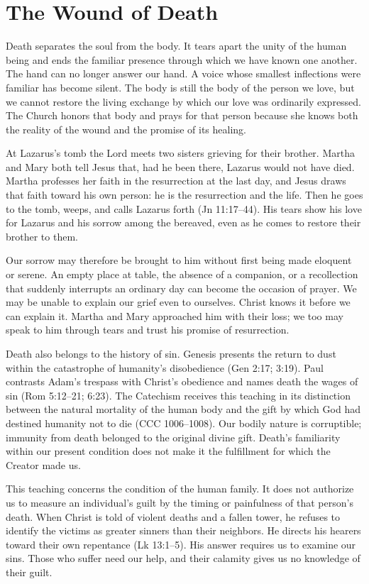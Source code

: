 \section{The Wound of Death}

Death separates the soul from the body. It tears apart the unity of the human being and ends the familiar presence through which we have known one another. The hand can no longer answer our hand. A voice whose smallest inflections were familiar has become silent. The body is still the body of the person we love, but we cannot restore the living exchange by which our love was ordinarily expressed. The Church honors that body and prays for that person because she knows both the reality of the wound and the promise of its healing.

At Lazarus's tomb the Lord meets two sisters grieving for their brother. Martha and Mary both tell Jesus that, had he been there, Lazarus would not have died. Martha professes her faith in the resurrection at the last day, and Jesus draws that faith toward his own person: he is the resurrection and the life. Then he goes to the tomb, weeps, and calls Lazarus forth (Jn 11:17--44). His tears show his love for Lazarus and his sorrow among the bereaved, even as he comes to restore their brother to them.

Our sorrow may therefore be brought to him without first being made eloquent or serene. An empty place at table, the absence of a companion, or a recollection that suddenly interrupts an ordinary day can become the occasion of prayer. We may be unable to explain our grief even to ourselves. Christ knows it before we can explain it. Martha and Mary approached him with their loss; we too may speak to him through tears and trust his promise of resurrection.

Death also belongs to the history of sin. Genesis presents the return to dust within the catastrophe of humanity's disobedience (Gen 2:17; 3:19). Paul contrasts Adam's trespass with Christ's obedience and names death the wages of sin (Rom 5:12--21; 6:23). The Catechism receives this teaching in its distinction between the natural mortality of the human body and the gift by which God had destined humanity not to die (CCC 1006--1008). Our bodily nature is corruptible; immunity from death belonged to the original divine gift. Death's familiarity within our present condition does not make it the fulfillment for which the Creator made us.

This teaching concerns the condition of the human family. It does not authorize us to measure an individual's guilt by the timing or painfulness of that person's death. When Christ is told of violent deaths and a fallen tower, he refuses to identify the victims as greater sinners than their neighbors. He directs his hearers toward their own repentance (Lk 13:1--5). His answer requires us to examine our sins. Those who suffer need our help, and their calamity gives us no knowledge of their guilt.

